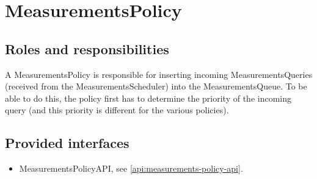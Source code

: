 \section{MeasurementsPolicy}
\label{element:measurements-policy}

\subsection{Roles and responsibilities}

\npar A MeasurementsPolicy is responsible for inserting incoming
MeasurementsQueries (received from the MeasurementsScheduler) into the
MeasurementsQueue. To be able to do this, the policy first has to determine the
priority of the incoming query (and this priority is different for the various
policies).

\subsection{Provided interfaces}

\begin{itemize}
  \item MeasurementsPolicyAPI, see \ref{api:measurements-policy-api}.
\end{itemize}
